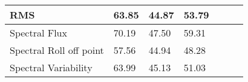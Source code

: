 \begin{table}[h!]
\begin{center}
\begin{tabular}{|l|l|l|l|l|l|l|}
                        RMS
                        &
                        63.85
                        &
                        44.87
                        &
                        53.79
\\\hline

                        Spectral Flux
                        &
                        70.19
                        &
                        47.50
                        &
                        59.31
                        \\\hline

                        Spectral Roll off point
                        &
                        57.56
                        &
                        44.94
                        &
                        48.28
                        \\\hline

                        Spectral Variability
                        &
                        63.99
                        &
                        45.13
                        &
                        51.03
                        \\\hline


                 \end{tabular}
        \end{center}
\end{table}
